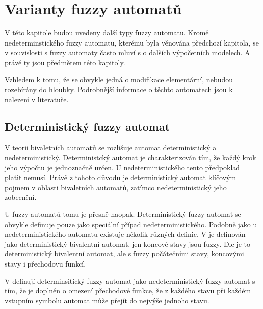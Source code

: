 \documentclass[a4paper,10pt]{article}
\begin{document}


\section{Varianty fuzzy automatů}
V této kapitole budou uvedeny další typy fuzzy automatu. Kromě nedeterminstického fuzzy automatu, kterému byla věnována předchozí kapitola, se v souvislosti s fuzzy automaty často mluví s o dalších výpočetních modelech. A právě ty jsou předmětem této kapitoly. 

Vzhledem k tomu, že se obvykle jedná o modifikace elementární, nebudou rozebírány do hloubky. Podrobnější informace o těchto automatech jsou k nalezení v literatuře.

\subsection{Deterministický fuzzy automat}
V teorii  bivaletních automatů se rozlišuje automat deterministický a nedeterministický. Deterministcký automat je charakterizován tím, že každý krok jeho výpočtu je jednoznačně určen. U nedeterministického tento předpoklad platit nemusí. Právě z tohoto důvodu je deterministický automat klíčovým pojmem v oblasti  bivaletních automatů, zatímco nedeterministický jeho zobecnění.

U fuzzy automatů tomu je přesně naopak. Deterministický fuzzy automat se obvykle definuje pouze jako speciální případ nedeterministického. Podobně jako u nedeterministického automatu existuje několik různých definic. V \cite{Bel-DetFuzAut} je definován jako deterministický bivalentní automat, jen koncové stavy jsou fuzzy. Dle \cite{LiLiLi-RelAmoSevTypFuzAut} je to deterministický bivalentní automat, ale s fuzzy počátečními stavy, koncovými stavy i přechodovu funkcí.

V \cite{GonGar-FuzzLangInfRanAccGuzzAutPumLemDetProc} definují determinsitický fuzzy automat jako nedeterministický fuzzy automat s tím, že je doplněn o omezení přechodové funkce, že z každého stavu při každém vstupním symbolu automat může přejít do nejvýše jednoho stavu.
\end{document}
